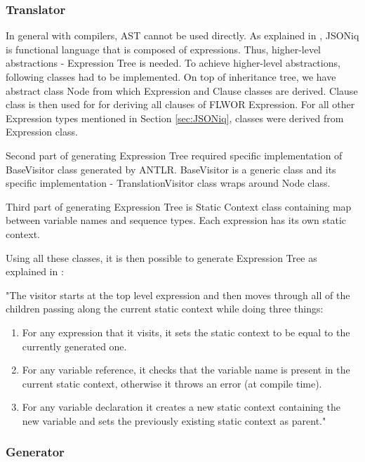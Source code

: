 \subsubsection{Translator}
In general with compilers, AST cannot be used directly. As explained in \cite{RumbleMLThesis}, JSONiq is functional language that is composed of expressions. Thus, higher-level abstractions - Expression Tree is needed. To achieve higher-level abstractions, following classes had to be implemented. On top of inheritance tree, we have abstract class Node from which Expression and Clause classes are derived. Clause class is then used for for deriving all clauses of FLWOR Expression. For all other Expression types mentioned in Section \ref{sec:JSONiq}, classes were derived from Expression class. 

Second part of generating Expression Tree required specific implementation of BaseVisitor class generated by ANTLR. BaseVisitor is a generic class and its specific implementation - TranslationVisitor class wraps around Node class. 

Third part of generating Expression Tree is Static Context class containing map between variable names and sequence types. Each expression has its own static context.

Using all these classes, it is then possible to generate Expression Tree as explained in \cite{RumbleThesis}: 

"The visitor starts at the top level expression and then moves through all of the children passing along the current static context while doing three things:
\begin{enumerate}
	\item For any expression that it visits, it sets the static context to be equal to the currently generated one.
	\item For any variable reference, it checks that the variable name is present in the current static context, otherwise it throws an error (at compile time).
	\item For any variable declaration it creates a new static context containing the new variable and sets the previously existing static context as parent."
\end{enumerate}



\subsubsection{Generator}
